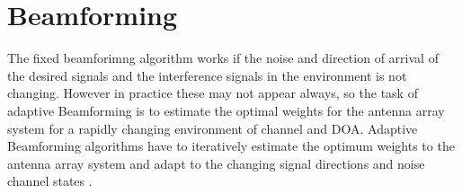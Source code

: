 \section{Beamforming}

The fixed beamforimng algorithm works if the noise and direction of arrival of the desired signals and the interference signals in the environment is not changing. However in practice these may not appear always, so the task of adaptive Beamforming is to estimate the optimal weights for the antenna array system for a rapidly changing environment of channel and DOA. Adaptive Beamforming algorithms have to iteratively estimate the optimum weights to the antenna array system and adapt to the changing signal directions and noise channel states \cite{ADR7}. 
